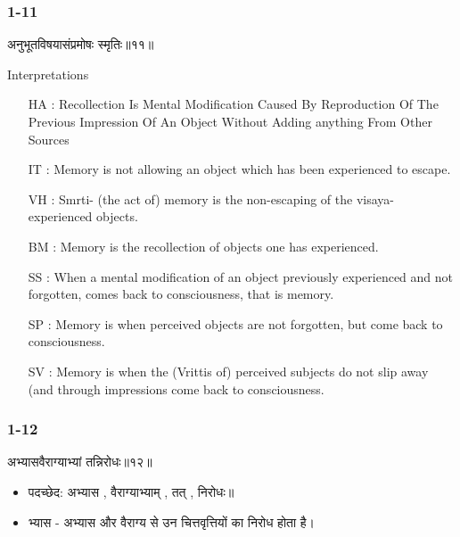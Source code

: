 \begin{frame}[fragile]\frametitle{1-11}
\begin{sanskrit}
अनुभूतविषयासंप्रमोषः स्मृतिः॥११॥
\end{sanskrit}

Interpretations
\begin{itemize}	
\item [HA]: Recollection Is Mental Modification Caused By Reproduction Of The Previous Impression Of An Object Without Adding anything From Other Sources
\item [IT]: Memory is not allowing an object which has been experienced to escape.
\item [VH]: Smrti- (the act of) memory is the non-escaping of the visaya-experienced objects.
\item [BM]: Memory is the recollection of objects one has experienced.
\item [SS]: When a mental modification of an object previously experienced and not forgotten, comes back to consciousness, that is memory.
\item [SP]: Memory is when perceived objects are not forgotten, but come back to consciousness.
\item [SV]: Memory is when the (Vrittis of) perceived subjects do not slip away (and through impressions come back to consciousness. 
\end{itemize}
	
\end{frame}


\begin{frame}[fragile]\frametitle{1-12}
\begin{sanskrit}
अभ्यासवैराग्याभ्यां तन्निरोधः॥१२॥
\end{sanskrit}

\begin{itemize}
\item पदच्छेद: अभ्यास , वैराग्याभ्याम् , तत् , निरोधः॥
\item भ्यास - अभ्यास और वैराग्य से उन चित्तवृत्तियों का निरोध होता है।
\end{itemize}
	
\end{frame}


